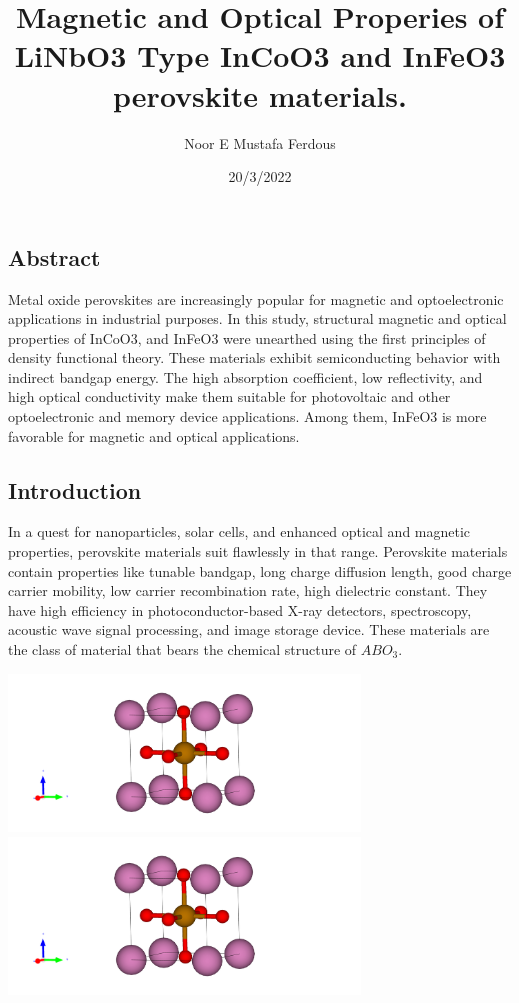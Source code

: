 \documentclass[12pt, letterpaper]{article}
\title{Magnetic and Optical Properies of  LiNbO3 Type InCoO3 and InFeO3 perovskite materials.}
\author{Noor E Mustafa Ferdous}
\date{20/3/2022}
\newcommand*{\1}{\hspace{1pt}}
\begin{document}
    \maketitle
    \subsection*{Abstract}
    Metal oxide perovskites are increasingly popular for magnetic and optoelectronic applications in industrial purposes. In this study, structural magnetic and 
    optical properties of InCoO3, and InFeO3 were unearthed using the first principles of density functional theory. These materials exhibit semiconducting behavior 
    with indirect bandgap energy. The high absorption coefficient, low reflectivity, and high optical conductivity make them suitable for photovoltaic and other 
    optoelectronic and memory device applications. Among them, InFeO3 is more favorable for magnetic and optical applications.

    \subsection*{Introduction}
    In a quest for nanoparticles, solar cells, and enhanced optical and magnetic properties, perovskite materials suit flawlessly in that range. Perovskite materials 
    contain properties like tunable bandgap, long charge diffusion length, good charge carrier mobility, low carrier recombination rate, high dielectric constant. 
    They have high efficiency in photoconductor-based X-ray detectors, spectroscopy, acoustic wave signal processing, and image storage device. These materials are 
    the class of material that bears the chemical structure of $ABO_{3}$.
    
    \begin{adjustbox}{center,caption={Cubic Structure of InCoO3 and InFeO3},label={somelabel},nofloat=figure,vspace=\bigskipamount}
        \includegraphics[width=0.7\textwidth]{InFeO3}
        \includegraphics[width=0.7\textwidth]{InFeO3}
    \end{adjustbox}
    
\end{document}
